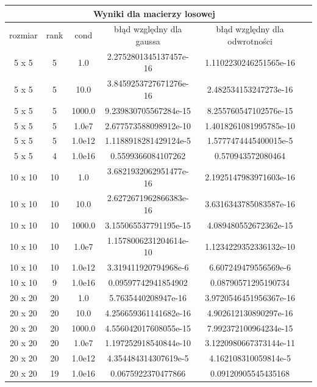 \documentclass[]{article}
\begin{document}
	\begin{table}[h!]
		\centering
		\label{tab:table1}
		\begin{tabular}{|c|c|c|c|c|c|}
			\hline
			\multicolumn{5}{|c|}{Wyniki dla macierzy losowej} \\
			\hline
			rozmiar & rank & cond & błąd względny dla gaussa & błąd względny dla odwrotności \\ 
			\hline
			5 x 5 & 5 & 1.0 & 2.2752801345137457e-16 & 1.1102230246251565e-16 \\ \hline
			5 x 5 & 5 & 10.0 & 3.8459253727671276e-16 & 2.482534153247273e-16 \\ \hline
			5 x 5 & 5 & 1000.0 & 9.239830705567284e-15 & 8.255760547102576e-15 \\ \hline
			5 x 5 & 5 & 1.0e7 & 2.677573588098912e-10 & 1.4018261081995785e-10 \\ \hline
			5 x 5 & 5 & 1.0e12 & 1.1188918281429124e-5 & 1.5777474445400015e-5 \\ \hline
			5 x 5 & 4 & 1.0e16 & 0.5599366084107262 & 0.570943572080464 \\ \hline
			10 x 10 & 10 & 1.0 & 3.6821932062951477e-16 & 2.1925147983971603e-16 \\ \hline
			10 x 10 & 10 & 10.0 & 2.6272671962866383e-16 & 3.6316343785083587e-16 \\ \hline
			10 x 10 & 10 & 1000.0 & 3.155065537791195e-15 & 4.089480552672362e-15 \\ \hline
			10 x 10 & 10 & 1.0e7 & 1.1578006231204614e-10 & 1.1234229352336132e-10 \\ \hline
			10 x 10 & 10 & 1.0e12 & 3.319411920794968e-6 & 6.607249479556569e-6 \\ \hline
			10 x 10 & 9 & 1.0e16 & 0.09597742941854902 & 0.08790571295190734 \\ \hline
			20 x 20 & 20 & 1.0 & 5.7635440208947e-16 & 3.9720546451956367e-16 \\ \hline
			20 x 20 & 20 & 10.0 & 4.256659361141682e-16 & 4.902612130890297e-16 \\ \hline
			20 x 20 & 20 & 1000.0 & 4.556042017608055e-15 & 7.992372100964234e-15 \\ \hline
			20 x 20 & 20 & 1.0e7 & 1.197252918540844e-10 & 3.1220980667373144e-11 \\ \hline
			20 x 20 & 20 & 1.0e12 & 4.354484314307619e-5 & 4.162108310059814e-5 \\ \hline
			20 x 20 & 19 & 1.0e16 & 0.0675922370477866 & 0.09120905545435168 \\ \hline
		\end{tabular}
	\end{table}
\end{document}
